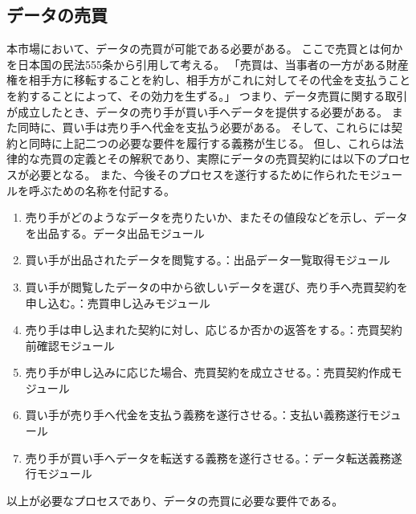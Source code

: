 \subsection{データの売買}
本市場において、データの売買が可能である必要がある。
ここで売買とは何かを日本国の民法555条から引用して考える。
「売買は、当事者の一方がある財産権を相手方に移転することを約し、相手方がこれに対してその代金を支払うことを約することによって、その効力を生ずる。」
つまり、データ売買に関する取引が成立したとき、データの売り手が買い手へデータを提供する必要がある。
また同時に、買い手は売り手へ代金を支払う必要がある。
そして、これらには契約と同時に上記二つの必要な要件を履行する義務が生じる。
但し、これらは法律的な売買の定義とその解釈であり、実際にデータの売買契約には以下のプロセスが必要となる。
また、今後そのプロセスを遂行するために作られたモジュールを呼ぶための名称を付記する。
\begin{enumerate}
\item 売り手がどのようなデータを売りたいか、またその値段などを示し、データを出品する。データ出品モジュール
\item 買い手が出品されたデータを閲覧する。：出品データ一覧取得モジュール
\item 買い手が閲覧したデータの中から欲しいデータを選び、売り手へ売買契約を申し込む。：売買申し込みモジュール
\item 売り手は申し込まれた契約に対し、応じるか否かの返答をする。：売買契約前確認モジュール
\item 売り手が申し込みに応じた場合、売買契約を成立させる。：売買契約作成モジュール
\item 買い手が売り手へ代金を支払う義務を遂行させる。：支払い義務遂行モジュール
\item 売り手が買い手へデータを転送する義務を遂行させる。：データ転送義務遂行モジュール
\end{enumerate}
以上が必要なプロセスであり、データの売買に必要な要件である。

